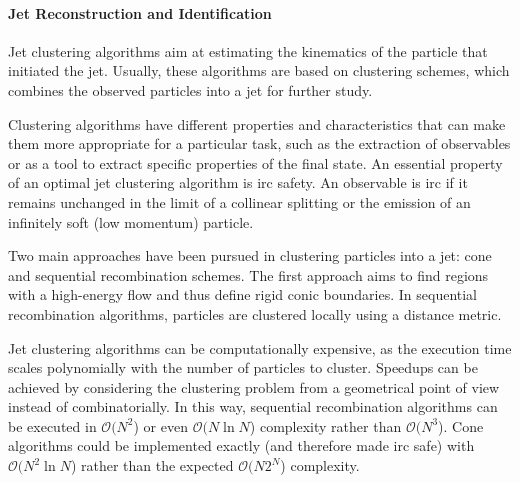 \paragraph{Jet Reconstruction and Identification}
\label{subsubsection:Jet reconstruction and identification}


Jet clustering algorithms aim at estimating the kinematics of the particle that initiated the jet. Usually, these algorithms are based on clustering schemes, which combines the observed particles into a jet for further study.

Clustering algorithms have different properties and characteristics that can make them more appropriate for a particular task, such as the extraction of observables or as a tool to extract specific properties of the final state. An essential property of an optimal jet clustering algorithm is \gls{irc} safety. An observable is \gls{irc} if it remains unchanged in the limit of a collinear splitting or the emission of an infinitely soft (low momentum) particle.

Two main approaches have been pursued in clustering particles into a jet: cone and sequential recombination schemes. The first approach aims to find regions with a high-energy flow and thus define rigid conic boundaries. In sequential recombination algorithms, particles are clustered locally using a distance metric.

Jet clustering algorithms can be computationally expensive, as the execution time scales polynomially with the number of particles to cluster. Speedups can be achieved by considering the clustering problem from a geometrical point of view instead of combinatorially. In this way, sequential recombination algorithms can be executed in $\mathcal{O}(N^2$) or even $\mathcal{O}(N \ln N$) complexity rather than $\mathcal{O}(N^3$). Cone algorithms could be implemented exactly (and therefore made \gls{irc} safe) with $\mathcal{O}(N^{2}\ln N$) rather than the expected $\mathcal{O}(N2^{N}$) complexity. 

